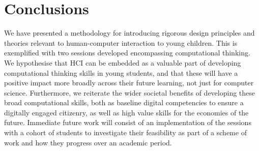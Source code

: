 \documentclass{sig-alternate}
\begin{document}
\section{Conclusions}

We have presented a methodology for introducing rigorous design
principles and theories relevant to human-computer interaction to
young children. This is exemplified with two sessions developed
encompassing computational thinking. We hypothesise that HCI can be
embedded as a valuable part of developing computational thinking
skills in young students, and that these will have a positive impact
more broadly across their future learning, not just for computer
science. Furthermore, we reiterate the wider societal benefits of
developing these broad computational skills, both as baseline digital
competencies to ensure a digitally engaged citizenry, as well as high
value skills for the economies of the future. Immediate future work
will consist of an implementation of the sessions with a cohort of
students to investigate their feasibility as part of a scheme of work
and how they progress over an academic period.












\end{document}
